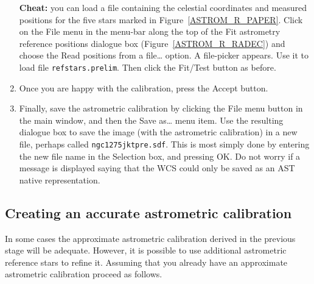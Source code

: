 \documentclass[twoside,11pt]{starlink}
\begin{document}
\begin{enumerate}
   \textbf{Cheat:} you can load a file containing the celestial coordinates
   and measured positions for the five stars marked in
   Figure~\ref{ASTROM_R_PAPER}.  Click on the \textsf{File} menu in the
   menu-bar along the top of the \textsf{Fit astrometry reference positions}
   dialogue box (Figure~\ref{ASTROM_R_RADEC}) and choose the \textsf{Read
   positions from a file\ldots} option.  A file-picker appears.  Use it to
   load file \texttt{refstars.prelim}.  Then click the \textsf{Fit/Test} button
   as before.

  \item Once you are happy with the calibration, press the \textsf{Accept}
   button.

  \item Finally, save the astrometric calibration by clicking the \textsf{File} menu button in the main window, and then the \textsf{Save as\ldots}
   menu item.  Use the resulting dialogue box to save the image (with
   the astrometric calibration) in a new file, perhaps called \texttt{ngc1275jktpre.sdf}.  This is most simply done by entering the new file
   name in the \textsf{Selection} box, and pressing \textsf{OK}.  Do not worry
   if a message is displayed saying that the WCS could only be saved as an
   AST native representation.

\end{enumerate}

\subsection{Creating an accurate astrometric calibration}

In some cases the approximate astrometric calibration derived in the
previous stage will be adequate.  However, it is possible to use
additional astrometric reference stars to refine it.  Assuming that
you already have an approximate astrometric calibration proceed as follows.
\end{document}
